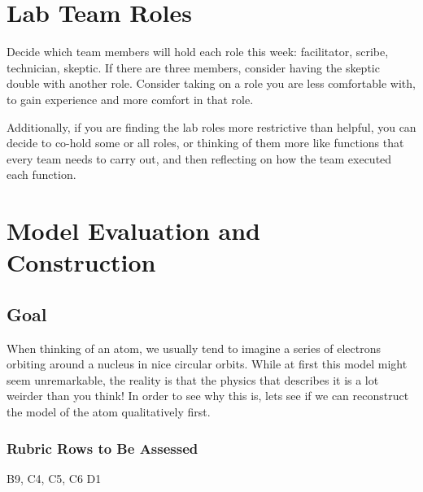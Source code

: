 \section{Lab Team Roles}

Decide which team members will hold each role this week: facilitator, scribe, technician, skeptic. If there are three members, consider having the skeptic double with another role. Consider taking on a role you are less comfortable with, to gain experience and more comfort in that role.

Additionally, if you are finding the lab roles more restrictive than helpful, you can decide to co-hold some or all roles, or thinking of them more like functions that every team needs to carry out, and then reflecting on how the team executed each function.

\section{Model Evaluation and Construction} 

\subsection{Goal} 
When thinking of an atom, we usually tend to imagine a series of electrons orbiting around a nucleus in nice circular orbits. While at first this model might seem unremarkable, the reality is that the physics that describes it is a lot weirder than you think! In order to see why this is, lets see if we can reconstruct the model of the atom qualitatively first.

\subsubsection{Rubric Rows to Be Assessed}

B9, C4, C5, C6 D1


